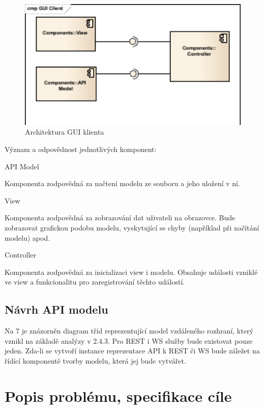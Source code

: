 \documentclass[11pt,twoside,a4paper]{book}
\begin{document}
\begin{itemize}
\begin{figure}[h]
\begin{center}
\includegraphics[width=13cm]{images-pdf/GUI-Client.pdf}
\caption{Architektura GUI klienta}
\label{fig:logo}
\end{center}
\end{figure}

Význam a odpovědnost jednotlivých komponent:

API Model

Komponenta zodpovědná za načtení modelu ze souboru a jeho uložení v ní.

View

Komponenta zodpovědná za zobrazování dat uživateli na obrazovce. Bude zobrazovat
grafickou podobu modelu, vyskytující se chyby (například při načítání modelu) apod.

Controller

Komponenta zodpovědná za inicializaci view i modelu. Obsahuje události vzniklé ve view a
funkcionalitu pro zaregistrování těchto událostí.

\section{Návrh API modelu}

Na 7 je znázorněn diagram tříd reprezentující model vzdáleného rozhraní, který vznikl na
základě analýzy v 2.4.3. Pro REST i WS služby bude existovat pouze jeden. Zda-li se vytvoří
instance reprezentace API k REST či WS bude záležet na řídící komponentě tvorby modelu,
která jej bude vytvářet.



\chapter{Popis problému, specifikace cíle}


\end{itemize}
\end{document}
